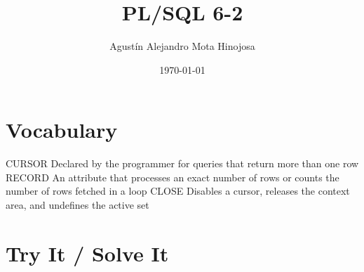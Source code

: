 \documentclass[11pt]{article}
\author{Agustín Alejandro Mota Hinojosa}
\date{\today}
\title{PL/SQL 6-2}
\begin{document}
\maketitle
\tableofcontents

\section{Vocabulary}
\label{sec:orgb8ec2a9}

CURSOR Declared by the programmer for queries that return more than one row
RECORD An attribute that processes an exact number of rows or counts the number of rows fetched in a loop
CLOSE Disables a cursor, releases the context area, and undefines the active set
\section{Try It / Solve It}
\label{sec:orgc1fe2c4}
\end{document}
